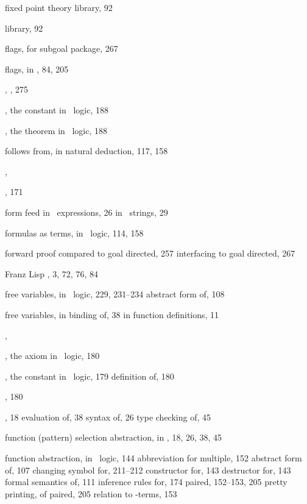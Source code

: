 \begin{theindex}
  \item fixed point theory library, 92
  \item {} library, 92
  \item flags, for subgoal package, 267
  \item flags, in \ML, 84, 205
  \item {}, , 275
  \item {}, the constant in \HOL\ logic, 188
  \item {}, the theorem in \HOL\ logic, 188
  \item follows from, in natural deduction, 117, 158
  \item {}, 
  \item {}, 171
  \item form feed
    \subitem in \ML\ expressions, 26
    \subitem in \ML\ strings, 29
  \item formulas as terms, in \HOL\ logic, 114, 158
  \item forward proof
    \subitem compared to goal directed, 257
    \subitem interfacing to goal directed, 267
  \item Franz Lisp \HOL, 3, 72, 76, 84
  \item free variables, in \HOL\ logic, 229, 231--234
    \subitem abstract form of, 108
  \item free variables, in \ML
    \subitem binding of, 38
    \subitem in function definitions, 11
  \item {}, 
  \item {}, the axiom in \HOL\ logic, 180
  \item {}, the constant in \HOL\ logic, 179
    \subitem definition of, 180
  \item {}, 180
  \item {\ml{|}\ml{$\cdots$}}, 18
    \subitem evaluation of, 38
    \subitem syntax of, 26
    \subitem type checking of, 45
  \item function (pattern) selection abstraction, in \ML, 18, 26, 38, 
		45
  \item function abstraction, in \HOL\ logic, 144
    \subitem abbreviation for multiple, 152
    \subitem abstract form of, 107
    \subitem changing symbol for, 211--212
    \subitem constructor for, 143
    \subitem destructor for, 143
    \subitem formal semantics of, 111
    \subitem inference rules for, 174
    \subitem paired, 152--153, 205
    \subitem pretty printing, of paired, 205
    \subitem relation to -terms, 153

\end{theindex}
